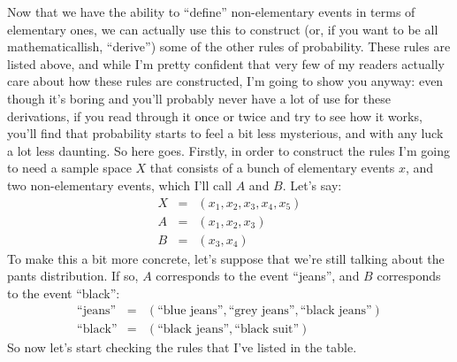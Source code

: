 \documentclass[]{book}
\begin{document}
Now that we have the ability to ``define'' non-elementary events in terms of elementary ones, we can actually use this to construct (or, if you want to be all mathematicallish, ``derive'') some of the other rules of probability. These rules are listed above, and while I'm pretty confident that very few of my readers actually care about how these rules are constructed, I'm going to show you anyway: even though it's boring and you'll probably never have a lot of use for these derivations, if you read through it once or twice and try to see how it works, you'll find that probability starts to feel a bit less mysterious, and with any luck a lot less daunting. So here goes. Firstly, in order to construct the rules I'm going to need a sample space \(X\) that consists of a bunch of elementary events \(x\), and two non-elementary events, which I'll call \(A\) and \(B\). Let's say: \[\begin{array}{rcl}
X &=& (x_1, x_2, x_3, x_4, x_5) \\
A &=& (x_1, x_2, x_3) \\
B &=& (x_3, x_4)
\end{array}\] To make this a bit more concrete, let's suppose that we're still talking about the pants distribution. If so, \(A\) corresponds to the event ``jeans'', and \(B\) corresponds to the event ``black'': \[\begin{array}{rcl}
\mbox{``jeans''} &=& (\mbox{``blue jeans''}, \mbox{``grey jeans''}, \mbox{``black jeans''}) \\
\mbox{``black''} &=& (\mbox{``black jeans''}, \mbox{``black suit''})
\end{array}\] So now let's start checking the rules that I've listed in the table.
\end{document}
